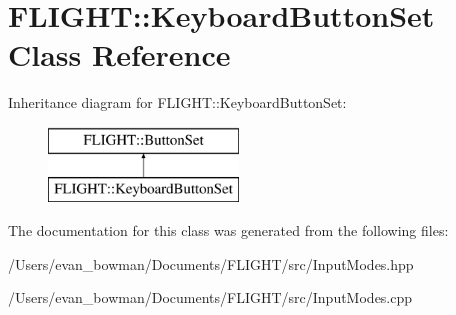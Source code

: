 \hypertarget{class_f_l_i_g_h_t_1_1_keyboard_button_set}{}\section{F\+L\+I\+G\+HT\+:\+:Keyboard\+Button\+Set Class Reference}
\label{class_f_l_i_g_h_t_1_1_keyboard_button_set}
Inheritance diagram for F\+L\+I\+G\+HT\+:\+:Keyboard\+Button\+Set\+:\begin{figure}[H]
\begin{center}
\leavevmode
\includegraphics[height=2.000000cm]{class_f_l_i_g_h_t_1_1_keyboard_button_set}
\end{center}
\end{figure}


The documentation for this class was generated from the following files\+:\begin{DoxyCompactItemize}
\item 
/\+Users/evan\+\_\+bowman/\+Documents/\+F\+L\+I\+G\+H\+T/src/Input\+Modes.\+hpp\item 
/\+Users/evan\+\_\+bowman/\+Documents/\+F\+L\+I\+G\+H\+T/src/Input\+Modes.\+cpp\end{DoxyCompactItemize}
